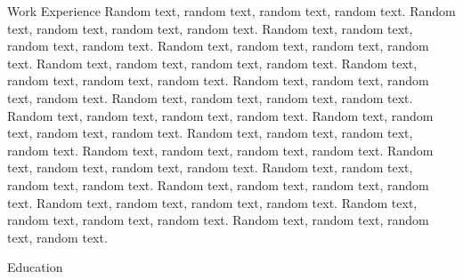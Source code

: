 \documentclass[purpleprocv]{procv}
\begin{document}
\begin{procv-twocolumns}
\begin{experience}{Work Experience}
          {Random text, random text, random text, random text. Random text, random text, random text, random text.
           \newline
           Random text, random text, random text, random text.}
          {Random text, random text, random text, random text. Random text, random text, random text, random text.
           \newline
           Random text, random text, random text, random text.}
          {Random text, random text, random text, random text. Random text, random text, random text, random text.
           \newline
           Random text, random text, random text, random text.}
          {Random text, random text, random text, random text. Random text, random text, random text, random text.
           \newline
           Random text, random text, random text, random text.}
          {Random text, random text, random text, random text. Random text, random text, random text, random text.
           \newline
           Random text, random text, random text, random text.}
          {Random text, random text, random text, random text. Random text, random text, random text, random text.
           \newline
           Random text, random text, random text, random text.}
        \end{experience}
        \newpage %
        \begin{experience}{Education}
\end{experience}
\end{procv-twocolumns}
\end{document}
